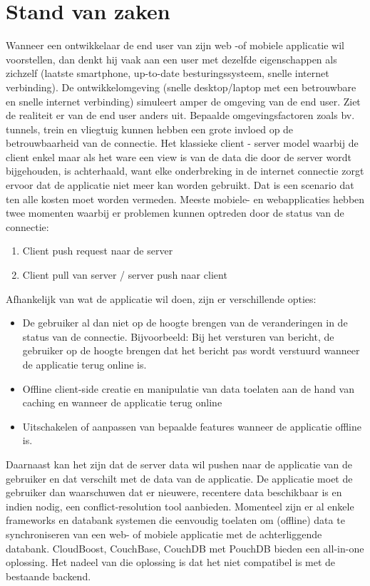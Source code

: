\section{Stand van zaken}
\label{sec:stand-van-zaken}
Wanneer een ontwikkelaar de end user van zijn web -of mobiele applicatie wil voorstellen, dan denkt hij vaak aan een user met dezelfde eigenschappen als zichzelf (laatste smartphone, up-to-date besturingssysteem,  snelle internet verbinding). De ontwikkelomgeving (snelle desktop/laptop met een betrouwbare en snelle internet verbinding) simuleert amper de omgeving van de end user. Ziet de realiteit er van de end user anders uit. Bepaalde omgevingsfactoren zoals bv. tunnels, trein en vliegtuig kunnen hebben een grote invloed op de betrouwbaarheid van de connectie. Het klassieke client - server model waarbij de client enkel maar als het ware een view is van de data die door de server wordt bijgehouden, is achterhaald, want elke onderbreking in de internet connectie zorgt ervoor dat de applicatie niet meer kan worden gebruikt. Dat is een scenario dat ten alle kosten moet worden vermeden. Meeste mobiele- en webapplicaties hebben twee momenten waarbij er problemen kunnen optreden door de status van de connectie:
\begin{enumerate}  
\item Client push request naar de server
\item Client pull van server / server push naar client
\end{enumerate}
Afhankelijk van wat de applicatie wil doen, zijn er verschillende opties:
\begin{itemize}  
\item De gebruiker al dan niet op de hoogte brengen van de veranderingen in de status van de connectie. Bijvoorbeeld: Bij het versturen van bericht, de gebruiker op de hoogte brengen dat het bericht pas wordt verstuurd wanneer de applicatie terug online is.
\item Offline client-side creatie en manipulatie van data toelaten aan de hand van caching en wanneer de applicatie terug online 
\item Uitschakelen of aanpassen van bepaalde features wanneer de applicatie offline is.
\end{itemize}
Daarnaast kan het zijn dat de server data wil pushen naar de applicatie van de gebruiker en dat verschilt met de data van de applicatie. De applicatie moet de gebruiker dan waarschuwen dat er nieuwere, recentere data beschikbaar is en indien nodig, een conflict-resolution tool aanbieden.
Momenteel zijn er al enkele frameworks en databank systemen die eenvoudig toelaten om (offline) data te synchroniseren van een web- of mobiele applicatie met de achterliggende databank. CloudBoost, CouchBase, CouchDB met PouchDB bieden een all-in-one oplossing. Het nadeel van die oplossing is dat het niet compatibel is met de bestaande backend.
